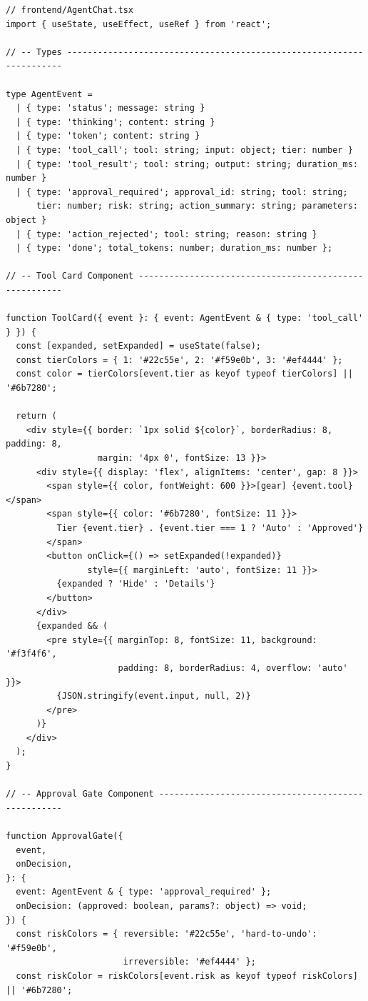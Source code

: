 \begin{lstlisting}[style=pythonstyle, caption={React frontend with streaming tool visualization and approval gates}]
// frontend/AgentChat.tsx
import { useState, useEffect, useRef } from 'react';

// -- Types ---------------------------------------------------------------------

type AgentEvent =
  | { type: 'status'; message: string }
  | { type: 'thinking'; content: string }
  | { type: 'token'; content: string }
  | { type: 'tool_call'; tool: string; input: object; tier: number }
  | { type: 'tool_result'; tool: string; output: string; duration_ms: number }
  | { type: 'approval_required'; approval_id: string; tool: string;
      tier: number; risk: string; action_summary: string; parameters: object }
  | { type: 'action_rejected'; tool: string; reason: string }
  | { type: 'done'; total_tokens: number; duration_ms: number };

// -- Tool Card Component -------------------------------------------------------

function ToolCard({ event }: { event: AgentEvent & { type: 'tool_call' } }) {
  const [expanded, setExpanded] = useState(false);
  const tierColors = { 1: '#22c55e', 2: '#f59e0b', 3: '#ef4444' };
  const color = tierColors[event.tier as keyof typeof tierColors] || '#6b7280';

  return (
    <div style={{ border: `1px solid ${color}`, borderRadius: 8, padding: 8,
                  margin: '4px 0', fontSize: 13 }}>
      <div style={{ display: 'flex', alignItems: 'center', gap: 8 }}>
        <span style={{ color, fontWeight: 600 }}>[gear] {event.tool}</span>
        <span style={{ color: '#6b7280', fontSize: 11 }}>
          Tier {event.tier} . {event.tier === 1 ? 'Auto' : 'Approved'}
        </span>
        <button onClick={() => setExpanded(!expanded)}
                style={{ marginLeft: 'auto', fontSize: 11 }}>
          {expanded ? 'Hide' : 'Details'}
        </button>
      </div>
      {expanded && (
        <pre style={{ marginTop: 8, fontSize: 11, background: '#f3f4f6',
                      padding: 8, borderRadius: 4, overflow: 'auto' }}>
          {JSON.stringify(event.input, null, 2)}
        </pre>
      )}
    </div>
  );
}

// -- Approval Gate Component ---------------------------------------------------

function ApprovalGate({
  event,
  onDecision,
}: {
  event: AgentEvent & { type: 'approval_required' };
  onDecision: (approved: boolean, params?: object) => void;
}) {
  const riskColors = { reversible: '#22c55e', 'hard-to-undo': '#f59e0b',
                       irreversible: '#ef4444' };
  const riskColor = riskColors[event.risk as keyof typeof riskColors] || '#6b7280';


\end{lstlisting}
